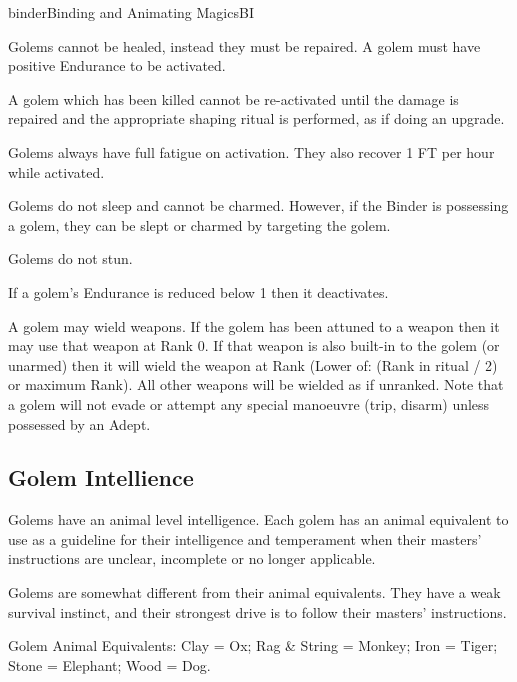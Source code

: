 \begin{college}[1.1]{binder}{Binding and Animating Magics}{BI}
\begin{Description}
\item[Damaged Golems] Golems cannot be healed, instead they must be
repaired.  A golem must have positive Endurance to be activated.

\item[Dead Golems] A golem which has been killed cannot be re-activated
until the damage is repaired and the appropriate shaping ritual is
performed, as if doing an upgrade.

\item[Fatigue Recovery] Golems always have full fatigue on activation.
They also recover 1 FT per hour while activated.

\item[Sleep and Charm] Golems do not sleep and cannot be charmed.
However, if the Binder is possessing a golem, they can be slept or
charmed by targeting the golem.

\item[Stun] Golems do not stun.

\item[Unconsciousness] If a golem's Endurance is reduced below 1 then
it deactivates.

\item[Weapon Ranks] A golem may wield weapons.  If the golem has been
attuned to a weapon then it may use that weapon at Rank 0.  If that
weapon is also built-in to the golem (or unarmed) then it will wield
the weapon at Rank (Lower of: (Rank in ritual / 2) or maximum Rank).
All other weapons will be wielded as if unranked.  Note that a golem
will not evade or attempt any special manoeuvre (\eg trip, disarm)
unless possessed by an Adept.
\end{Description}

\subsection{Golem Intellience}

Golems have an animal level intelligence. Each golem has an animal
equivalent to use as a guideline for their intelligence and
temperament when their masters' instructions are unclear, incomplete
or no longer applicable.

Golems are somewhat different from their animal equivalents.  They
have a weak survival instinct, and their strongest drive is to follow
their masters' instructions.

Golem Animal Equivalents: Clay = Ox; Rag \& String = Monkey; Iron =
Tiger; Stone = Elephant; Wood = Dog.


\end{college}
